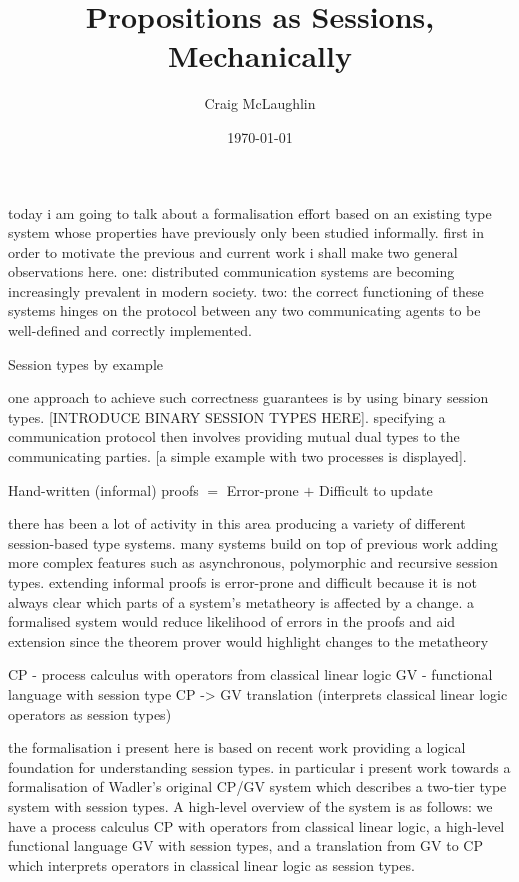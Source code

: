 \documentclass{beamer}
\title[Project Presentation]{Propositions as Sessions, Mechanically}
\author{Craig McLaughlin}
\institute{University Of Glasgow}
\date{\today}
\begin{document}
\begin{frame}
\titlepage
\end{frame}


today i am going to talk about a formalisation effort based on an existing
type system whose properties have previously only been studied
informally. first in order to motivate the previous and current work i shall
make two general observations here. one: distributed communication systems are
becoming increasingly prevalent in modern society. two: the correct
functioning of these systems hinges on the protocol between any two
communicating agents to be well-defined and correctly implemented.

\begin{frame}
Session types by example
\end{frame}

one approach to achieve such correctness guarantees is by using binary session
types. [INTRODUCE BINARY SESSION TYPES HERE]. specifying a communication
protocol then involves providing mutual dual types to the communicating
parties. [a simple example with two processes is displayed].

\begin{frame}
Hand-written (informal) proofs $=$ Error-prone $+$ Difficult to update
\end{frame}

there has been a lot of activity in this area producing a variety of different
session-based type systems. many systems build on top of previous work adding
more complex features such as asynchronous, polymorphic and recursive session
types. extending informal proofs is error-prone and difficult because it is
not always clear which parts of a system's metatheory is affected by a
change. a formalised system would reduce likelihood of errors in the proofs
and aid extension since the theorem prover would highlight changes to the
metatheory

\begin{frame}
CP - process calculus with operators from classical linear logic
GV - functional language with session type
CP -> GV translation (interprets classical linear logic operators as session
types)
\end{frame}

the formalisation i present here is based on recent work providing a logical
foundation for understanding session types. in particular i present work
towards a formalisation of Wadler's original CP/GV system which describes a
two-tier type system with session types. A high-level overview of the system
is as follows: we have a process calculus CP with operators from classical
linear logic, a high-level functional language GV with session types, and a
translation from GV to CP which interprets operators in classical linear logic
as session types.
\end{document}
